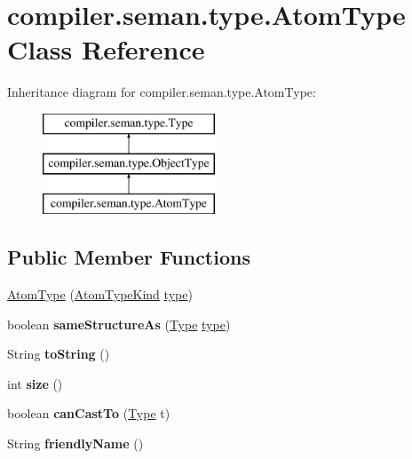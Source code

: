 \hypertarget{classcompiler_1_1seman_1_1type_1_1_atom_type}{}\section{compiler.\+seman.\+type.\+Atom\+Type Class Reference}
\label{classcompiler_1_1seman_1_1type_1_1_atom_type}
Inheritance diagram for compiler.\+seman.\+type.\+Atom\+Type\+:\begin{figure}[H]
\begin{center}
\leavevmode
\includegraphics[height=3.000000cm]{classcompiler_1_1seman_1_1type_1_1_atom_type}
\end{center}
\end{figure}
\subsection*{Public Member Functions}
\begin{DoxyCompactItemize}
\item 
\hyperlink{classcompiler_1_1seman_1_1type_1_1_atom_type_ab6b336d76df37a9432e9fbe4b511eae3}{Atom\+Type} (\hyperlink{enumcompiler_1_1abstr_1_1tree_1_1_atom_type_kind}{Atom\+Type\+Kind} \hyperlink{classcompiler_1_1seman_1_1type_1_1_atom_type_af4ae9198f0cfb5fef748ea2730ef2dcf}{type})
\item 
\mbox{\label{classcompiler_1_1seman_1_1type_1_1_atom_type_a473ca7723059ea6b68cfc61ad37df8cf}} 
boolean {\bfseries same\+Structure\+As} (\hyperlink{classcompiler_1_1seman_1_1type_1_1_type}{Type} \hyperlink{classcompiler_1_1seman_1_1type_1_1_atom_type_af4ae9198f0cfb5fef748ea2730ef2dcf}{type})
\item 
\mbox{\label{classcompiler_1_1seman_1_1type_1_1_atom_type_a1c7709a190e3cb542ad6910f2e715670}} 
String {\bfseries to\+String} ()
\item 
\mbox{\label{classcompiler_1_1seman_1_1type_1_1_atom_type_a73029e9ad2459b521a282a1fa912a2fd}} 
int {\bfseries size} ()
\item 
\mbox{\label{classcompiler_1_1seman_1_1type_1_1_atom_type_a2b3412d358a652f0c7a94f2332ac6e0d}} 
boolean {\bfseries can\+Cast\+To} (\hyperlink{classcompiler_1_1seman_1_1type_1_1_type}{Type} t)
\item 
\mbox{\label{classcompiler_1_1seman_1_1type_1_1_atom_type_a3f7961c02c1f54195653b216ff22d0be}} 
String {\bfseries friendly\+Name} ()
\end{DoxyCompactItemize}
